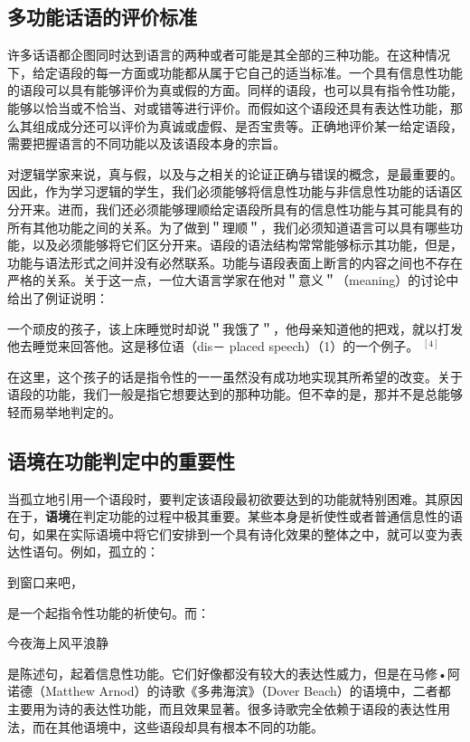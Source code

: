 \subsection{多功能话语的评价标准}

许多话语都企图同时达到语言的两种或者可能是其全部的三种功能。在这种情况下，给定语段的每一方面或功能都从属于它自己的适当标准。一个具有信息性功能的语段可以具有能够评价为真或假的方面。同样的语段，也可以具有指令性功能，能够以恰当或不恰当、对或错等进行评价。而假如这个语段还具有表达性功能，那么其组成成分还可以评价为真诚或虚假、是否宝贵等。正确地评价某一给定语段，需要把握语言的不同功能以及该语段本身的宗旨。

对逻辑学家来说，真与假，以及与之相关的论证正确与错误的概念，是最重要的。因此，作为学习逻辑的学生，我们必须能够将信息性功能与非信息性功能的话语区分开来。进而，我们还必须能够理顺给定语段所具有的信息性功能与其可能具有的所有其他功能之间的关系。为了做到＂理顺＂，我们必须知道语言可以具有哪些功能，以及必须能够将它们区分开来。语段的语法结构常常能够标示其功能，但是，功能与语法形式之间并没有必然联系。功能与语段表面上断言的内容之间也不存在严格的关系。关于这一点，一位大语言学家在他对＂意义＂（meaning）的讨论中给出了例证说明：

\begin{displayquote}
一个顽皮的孩子，该上床睡觉时却说＂我饿了＂，他母亲知道他的把戏，就以打发他去睡觉来回答他。这是移位语（dis－ placed speech）（1）的一个例子。 ${ }^{[4]}$
\end{displayquote}

在这里，这个孩子的话是指令性的一一虽然没有成功地实现其所希望的改变。关于语段的功能，我们一般是指它想要达到的那种功能。但不幸的是，那并不是总能够轻而易举地判定的。


\subsection{语境在功能判定中的重要性}

当孤立地引用一个语段时，要判定该语段最初欲要达到的功能就特别困难。其原因在于，\textbf{语境}在判定功能的过程中极其重要。某些本身是祈使性或者普通信息性的语句，如果在实际语境中将它们安排到一个具有诗化效果的整体之中，就可以变为表达性语句。例如，孤立的：

到窗口来吧，

是一个起指令性功能的祈使句。而：

今夜海上风平浪静

是陈述句，起着信息性功能。它们好像都没有较大的表达性威力，但是在马修•阿诺德（Matthew Arnod）的诗歌《多弗海滨》（Dover Beach）的语境中，二者都主要用为诗的表达性功能，而且效果显著。很多诗歌完全依赖于语段的表达性用法，而在其他语境中，这些语段却具有根本不同的功能。

